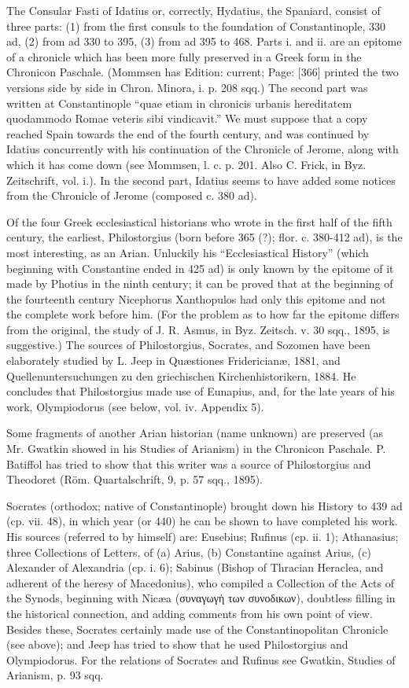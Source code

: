 The Consular Fasti of Idatius or, correctly, Hydatius, the Spaniard, consist of three parts: (1) from the first consuls to the foundation of Constantinople, 330 ad, (2) from ad 330 to 395, (3) from ad 395 to 468. Parts i. and ii. are an epitome of a chronicle which has been more fully preserved in a Greek form in the Chronicon Paschale. (Mommsen has Edition: current; Page: [366] printed the two versions side by side in Chron. Minora, i. p. 208 sqq.) The second part was written at Constantinople \texthebrew{“}quae etiam in chronicis urbanis hereditatem quodammodo Romae veteris sibi vindicavit.\texthebrew{}” We must suppose that a copy reached Spain towards the end of the fourth century, and was continued by Idatius concurrently with his continuation of the Chronicle of Jerome, along with which it has come down (see Mommsen, l. c. p. 201. Also C. Frick, in Byz. Zeitschrift, vol. i.). In the second part, Idatius seems to have added some notices from the Chronicle of Jerome (composed c. 380 ad).

Of the four Greek ecclesiastical historians who wrote in the first half of the fifth century, the earliest, Philostorgius (born before 365 (?); flor. c. 380-412 ad), is the most interesting, as an Arian. Unluckily his \texthebrew{“}Ecclesiastical History\texthebrew{}” (which beginning with Constantine ended in 425 ad) is only known by the epitome of it made by Photius in the ninth century; it can be proved that at the beginning of the fourteenth century Nicephorus Xanthopulos had only this epitome and not the complete work before him. (For the problem as to how far the epitome differs from the original, the study of J. R. Asmus, in Byz. Zeitsch. v. 30 sqq., 1895, is suggestive.) The sources of Philostorgius, Socrates, and Sozomen have been elaborately studied by L. Jeep in Quæstiones Fridericianæ, 1881, and Quellenuntersuchungen zu den griechischen Kirchenhistorikern, 1884. He concludes that Philostorgius made use of Eunapius, and, for the late years of his work, Olympiodorus (see below, vol. iv. Appendix 5).

Some fragments of another Arian historian (name unknown) are preserved (as Mr. Gwatkin showed in his Studies of Arianism) in the Chronicon Paschale. P. Batiffol has tried to show that this writer was a source of Philostorgius and Theodoret (Röm. Quartalschrift, 9, p. 57 sqq., 1895).

Socrates (orthodox; native of Constantinople) brought down his History to 439 ad (cp. vii. 48), in which year (or 440) he can be shown to have completed his work. His sources (referred to by himself) are: Eusebius; Rufinus (cp. ii. 1); Athanasius; three Collections of Letters, of (a) Arius, (b) Constantine against Arius, (c) Alexander of Alexandria (cp. i. 6); Sabinus (Bishop of Thracian Heraclea, and adherent of the heresy of Macedonius), who compiled a Collection of the Acts of the Synods, beginning with Nicæa (\textgreek{συναγωγ\texthebrew{ὴ} των συνοδικων}), doubtless filling in the historical connection, and adding comments from his own point of view. Besides these, Socrates certainly made use of the Constantinopolitan Chronicle (see above); and Jeep has tried to show that he used Philostorgius and Olympiodorus. For the relations of Socrates and Rufinus see Gwatkin, Studies of Arianism, p. 93 sqq.

